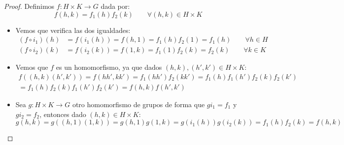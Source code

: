 \begin{teo}
    \begin{proof}
        Definimos $f:H\times K\to G$ dada por:
        \begin{equation*}
            f(h,k) = f_1(h)f_2(k) \qquad \forall (h,k)\in H\times K
        \end{equation*}
        \begin{itemize}
            \item Vemos que verifica las dos igualdades:
                \begin{align*}
                    (f\circ i_1)(h) &= f(i_1(h)) = f(h,1) = f_1(h)f_2(1) = f_1(h) \qquad \forall h\in H \\
                    (f\circ i_2)(k) &= f(i_2(k)) = f(1,k) = f_1(1)f_2(k) = f_2(k) \qquad \forall k\in K 
                \end{align*}
            \item Vemos que $f$ es un homomorfismo, ya que dados $(h,k),(h',k')\in H\times K$:
                \begin{multline*}
                    f((h,k)(h',k')) = f(hh',kk') = f_1(hh')f_2(kk') = f_1(h)f_1(h')f_2(k)f_2(k') \\ = f_1(h)f_2(k)f_1(h')f_2(k') = f(h,k)f(h',k')
                \end{multline*}
            \item Sea $g:H\times K\to G$ otro homomorfismo de grupos de forma que $gi_1 = f_1$ y $gi_2 = f_2$, entonces dado $(h,k)\in H\times K$:
                \begin{equation*}
                    g(h,k) = g((h,1)(1,k)) = g(h,1)g(1,k) = g(i_1(h))g(i_2(k)) = f_1(h)f_2(k) = f(h,k)
                \end{equation*} \qedhere
        \end{itemize}
    \end{proof}
\end{teo}

